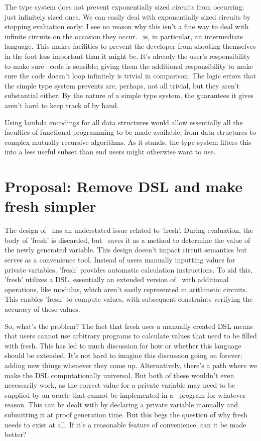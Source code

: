 \documentclass[
    9pt,            %
    techreport,        %
    affiltop,       %
]{art}
\begin{document}
The type system does not prevent exponentially sized circuits from occurring; just infinitely sized ones. We can easily deal with exponentially sized circuits by stopping evaluation early; I see no reason why this isn't a fine way to deal with infinite circuits on the occasion they occur. \VampIR{}\ is, in particular, an intermediate language. This makes facilities to prevent the developer from shooting themselves in the foot less important than it might be. It's already the user's responsibility to make sure \VampIR{}\ code is sensible; giving them the additional responsibility to make sure the code doesn't loop infinitely is trivial in comparison. The logic errors that the simple type system prevents are, perhaps, not all trivial, but they aren't substantial either. By the nature of a simple type system, the guarantees it gives aren't hard to keep track of by hand.

Using lambda encodings for all data structures would allow essentially all the faculties of functional programming to be made available; from data structures to complex mutually recursive algorithms. As it stands, the type system filters this into a less useful subset than end users might otherwise want to use.

\section{Proposal: Remove DSL and make fresh simpler}

The design of \VampIR{}\ has an understated issue related to 'fresh'. During evaluation, the body of 'fresh' is discarded, but \VampIR{}\ saves it as a method to determine the value of the newly generated variable. This design doesn't impact circuit semantics but serves as a convenience tool. Instead of users manually inputting values for private variables, 'fresh' provides automatic calculation instructions. To aid this, 'fresh' utilizes a DSL, essentially an extended version of \VampIR{}\ with additional operations, like modulus, which aren't easily represented in arithmetic circuits. This enables 'fresh' to compute values, with subsequent constraints verifying the accuracy of these values.

So, what's the problem? The fact that fresh uses a manually created DSL means that users cannot use arbitrary programs to calculate values that need to be filled with fresh. This has led to much discussion for how or whether this language should be extended. It's not hard to imagine this discussion going on forever; adding new things whenever they come up. Alternatively, there's a path where we make the DSL computationally universal. But both of these wouldn't even necessarily work, as the correct value for a private variable may need to be supplied by an oracle that cannot be implemented in a \VampIR{}\ program for whatever reason. This can be dealt with by declaring a private variable manually and submitting it at proof generation time. But this begs the question of why fresh needs to exist at all. If it's a reasonable feature of convenience, can it be made better?
\end{document}
